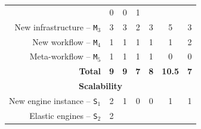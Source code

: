 \documentclass[preprint,3p,twocolumn]{elsarticle}
\begin{document}
\begin{table}
\begin{tabular}{rcccccc}
                                     & \cellcolor[HTML]{99FF99}0
                                     & \cellcolor[HTML]{99FF99}0
                                     & \cellcolor[HTML]{99FF99}1 \\
New infrastructure -- \texttt{M$_3$} & \cellcolor[HTML]{99FF99}3
                                     & \cellcolor[HTML]{99FF99}3
                                     & \cellcolor[HTML]{99FF99}2
                                     & \cellcolor[HTML]{99FF99}3
                                     & \cellcolor[HTML]{99FF99}5
                                     & \cellcolor[HTML]{99FF99}3 \\
New workflow -- \texttt{M$_4$}       & \cellcolor[HTML]{99FF99}1
                                     & \cellcolor[HTML]{99FF99}1
                                     & \cellcolor[HTML]{99FF99}1
                                     & \cellcolor[HTML]{99FF99}1
                                     & \cellcolor[HTML]{99FF99}1
                                     & \cellcolor[HTML]{99AA99}2 \\
Meta-workflow  -- \texttt{M$_5$}     & \cellcolor[HTML]{99AA99}1
                                     & \cellcolor[HTML]{99AA99}1  
                                     & \cellcolor[HTML]{99AA99}1
                                     & \cellcolor[HTML]{99AA99}1
                                     & \cellcolor[HTML]{99FF99}0
                                     & \cellcolor[HTML]{99AA99}0 \\
\textbf{Total}                       & \cellcolor[HTML]{99AA99}\textbf{9}
                                     & \cellcolor[HTML]{99EE99}\textbf{9}
                                     & \cellcolor[HTML]{99FF99}\textbf{7}
                                     & \cellcolor[HTML]{99EE99}\textbf{8}
                                     & \cellcolor[HTML]{99FF99}\textbf{10.5}
                                     & \cellcolor[HTML]{99AA99}\textbf{7} \\
\multicolumn{7}{c}{\cellcolor[HTML]{EEEEEE}\textbf{Scalability}}\\
New engine instance -- \texttt{S$_1$}& \cellcolor[HTML]{99AA99}2
                                     & \cellcolor[HTML]{99AA99}1
                                     & \cellcolor[HTML]{99FF99}0
                                     & \cellcolor[HTML]{99FF99}0
                                     & \cellcolor[HTML]{99AA99}1
                                     & \cellcolor[HTML]{99AA99}1 \\
Elastic engines -- \texttt{S$_2$}    & \cellcolor[HTML]{99AA99}2

\end{tabular}
\end{table}
\end{document}
